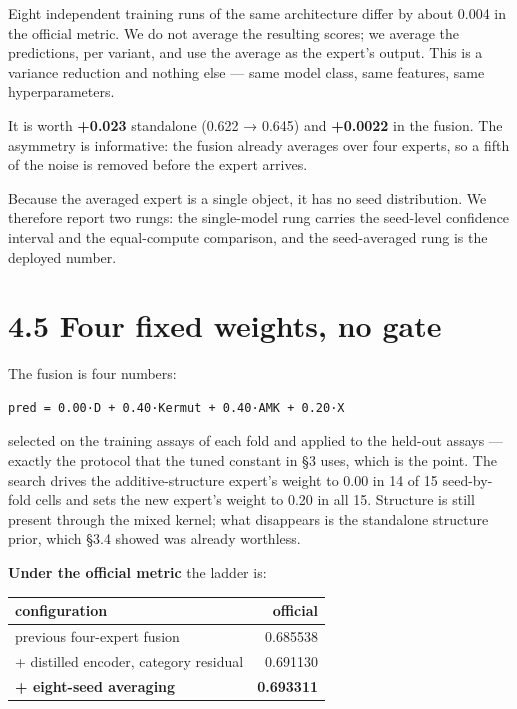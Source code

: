 \documentclass[sigconf,review,nonacm]{acmart}
\begin{document}
Eight independent training runs of the same architecture differ by about 0.004 in the official metric.
We do not average the resulting scores; we average the predictions, per variant, and use the average as
the expert's output. This is a variance reduction and nothing else --- same model class, same features,
same hyperparameters.

It is worth \textbf{+0.023} standalone (0.622 → 0.645) and \textbf{+0.0022} in the fusion. The asymmetry is
informative: the fusion already averages over four experts, so a fifth of the noise is removed before
the expert arrives.

Because the averaged expert is a single object, it has no seed distribution. We therefore report two
rungs: the single-model rung carries the seed-level confidence interval and the equal-compute
comparison, and the seed-averaged rung is the deployed number.

\hypertarget{four-fixed-weights-no-gate}{%
\section{4.5 Four fixed weights, no gate}\label{four-fixed-weights-no-gate}}

The fusion is four numbers:

\begin{verbatim}
pred = 0.00·D + 0.40·Kermut + 0.40·AMK + 0.20·X
\end{verbatim}

selected on the training assays of each fold and applied to the held-out assays --- exactly the protocol
that the tuned constant in §3 uses, which is the point. The search drives the additive-structure
expert's weight to 0.00 in 14 of 15 seed-by-fold cells and sets the new expert's weight to 0.20 in all
15. Structure is still present through the mixed kernel; what disappears is the standalone structure
prior, which §3.4 showed was already worthless.

\textbf{Under the official metric} the ladder is:

\begin{table}[t]
\centering
\small
\begin{tabular}{lr}
\hline
configuration & official \\
\hline
previous four-expert fusion & 0.685538 \\
+ distilled encoder, category residual & 0.691130 \\
\textbf{+ eight-seed averaging} & \textbf{0.693311} \\
\hline
\end{tabular}
\end{table}
\end{document}
